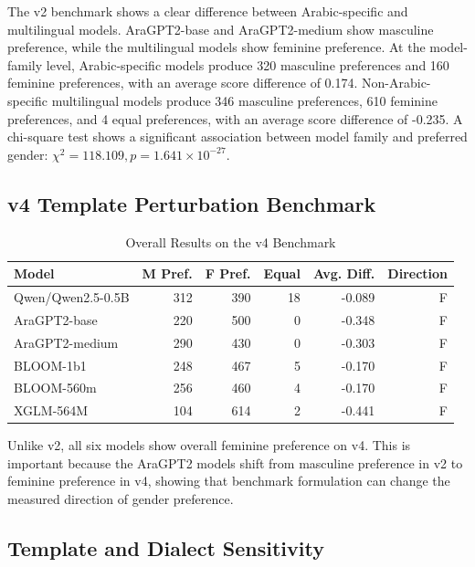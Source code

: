 \documentclass[conference]{IEEEtran}
\begin{document}
The v2 benchmark shows a clear difference between Arabic-specific and multilingual models. AraGPT2-base and AraGPT2-medium show masculine preference, while the multilingual models show feminine preference. At the model-family level, Arabic-specific models produce 320 masculine preferences and 160 feminine preferences, with an average score difference of 0.174. Non-Arabic-specific multilingual models produce 346 masculine preferences, 610 feminine preferences, and 4 equal preferences, with an average score difference of -0.235. A chi-square test shows a significant association between model family and preferred gender: \(\chi^2 = 118.109, p = 1.641 \times 10^{-27}\).

\subsection{v4 Template Perturbation Benchmark}

\begin{table}[htbp]
\caption{Overall Results on the v4 Benchmark}
\begin{center}
\begin{tabular}{lrrrrr}
\toprule
Model & M Pref. & F Pref. & Equal & Avg. Diff. & Direction \\
\midrule
Qwen/Qwen2.5-0.5B & 312 & 390 & 18 & -0.089 & F \\
AraGPT2-base & 220 & 500 & 0 & -0.348 & F \\
AraGPT2-medium & 290 & 430 & 0 & -0.303 & F \\
BLOOM-1b1 & 248 & 467 & 5 & -0.170 & F \\
BLOOM-560m & 256 & 460 & 4 & -0.170 & F \\
XGLM-564M & 104 & 614 & 2 & -0.441 & F \\
\bottomrule
\end{tabular}
\label{tab:v4}
\end{center}
\end{table}

Unlike v2, all six models show overall feminine preference on v4. This is important because the AraGPT2 models shift from masculine preference in v2 to feminine preference in v4, showing that benchmark formulation can change the measured direction of gender preference.

\subsection{Template and Dialect Sensitivity}
\end{document}

